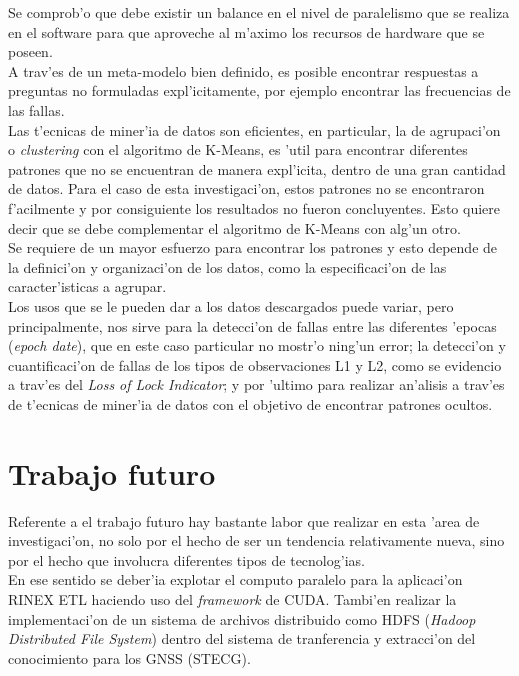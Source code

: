 Se comprob'o que debe existir un balance en el nivel de paralelismo que se realiza en el software para que aproveche al m'aximo los recursos de hardware que se poseen. \\

A trav'es de un meta-modelo bien definido, es posible encontrar respuestas a preguntas no formuladas expl'icitamente, por ejemplo encontrar las frecuencias de las fallas.\\

Las t'ecnicas de miner'ia de datos son eficientes, en particular, la de agrupaci'on o \emph{clustering} con el algoritmo de K-Means, es 'util para encontrar diferentes patrones que no se encuentran de manera expl'icita, dentro de una gran cantidad de datos. Para el caso de esta investigaci'on, estos patrones no se encontraron f'acilmente y por consiguiente los resultados no fueron concluyentes. Esto quiere decir que se debe complementar el algoritmo de K-Means con alg'un otro. \\
Se requiere de un mayor esfuerzo para encontrar los patrones y esto depende de la definici'on y organizaci'on de los datos, como la especificaci'on de las caracter'isticas a agrupar.\\

Los usos que se le pueden dar a los datos descargados puede variar, pero principalmente, nos sirve para la detecci'on de fallas entre las diferentes 'epocas (\emph{epoch date}), que en este caso particular no mostr'o ning'un error; la detecci'on y cuantificaci'on de fallas de los tipos de observaciones L1 y L2, como se evidencio a trav'es del \emph{Loss of Lock Indicator}; y por 'ultimo para realizar an'alisis a trav'es de t'ecnicas de miner'ia de datos con el objetivo de encontrar patrones ocultos. 

\section{Trabajo futuro}
\noindent
Referente a el trabajo futuro hay bastante labor que realizar en esta 'area de investigaci'on, no solo por el hecho de ser un tendencia relativamente nueva, sino por el hecho que involucra diferentes tipos de tecnolog'ias. \\

En ese sentido se deber'ia explotar el computo paralelo para la aplicaci'on RINEX ETL haciendo uso del \emph{framework} de CUDA. Tambi'en realizar la implementaci'on de un sistema de archivos distribuido como HDFS (\emph{Hadoop Distributed File System}) dentro del sistema de tranferencia y extracci'on del conocimiento para los GNSS (STECG).\\

